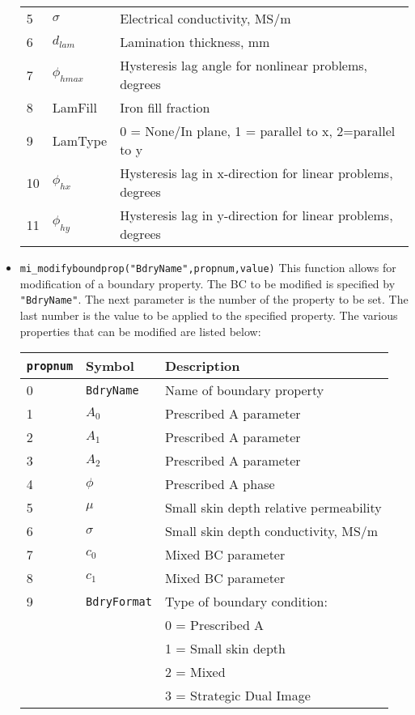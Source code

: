 \begin{itemize}
\begin{center}
\begin{tabular}{lll}
 5 & $\sigma$ & Electrical conductivity, MS/m \\
 6 & $d_{lam}$  & Lamination thickness, mm \\
 7 & $\phi_{hmax}$ & Hysteresis lag angle for nonlinear problems, degrees \\
 8 & LamFill & Iron fill fraction \\
 9 & LamType & 0 = None/In plane, 1 = parallel to x, 2=parallel to y \\
 10 & $\phi_{hx}$ & Hysteresis lag in x-direction for linear problems, degrees \\
 11 & $\phi_{hy}$ & Hysteresis lag in y-direction for linear problems, degrees \\
 \hline
 \end{tabular}
 \end{center}
\item{\verb+mi_modifyboundprop("BdryName",propnum,value)+}
This function allows for modification of a boundary property. The
BC to be modified is specified by {\tt "BdryName"}.  The next
parameter is the number of the property to be set. The last number
is the value to be applied to the specified property.  The various
properties that can be modified are listed below:
\begin{center}
\begin{tabular}{lll} \hline
{\tt propnum}& Symbol & Description \\ \hline
 0 & {\tt BdryName} & Name of boundary property \\
 1 & $A_0$ & Prescribed A parameter \\
 2 & $A_1$ & Prescribed A parameter \\
 3 & $A_2$ & Prescribed A parameter \\
 4 & $\phi$ & Prescribed A phase \\
 5 & $\mu$ & Small skin depth relative permeability \\
 6 & $\sigma$ & Small skin depth conductivity, MS/m \\
 7 & $c_0$ & Mixed BC parameter \\
 8 & $c_1$ & Mixed BC parameter \\
 9 & {\tt BdryFormat} & Type of boundary condition: \\
   &                 & 0 = Prescribed A \\
   &                 & 1 = Small skin depth \\
   &                 & 2 = Mixed \\
   &                 & 3 = Strategic Dual Image \\

\end{tabular}
\end{center}
\end{itemize}
